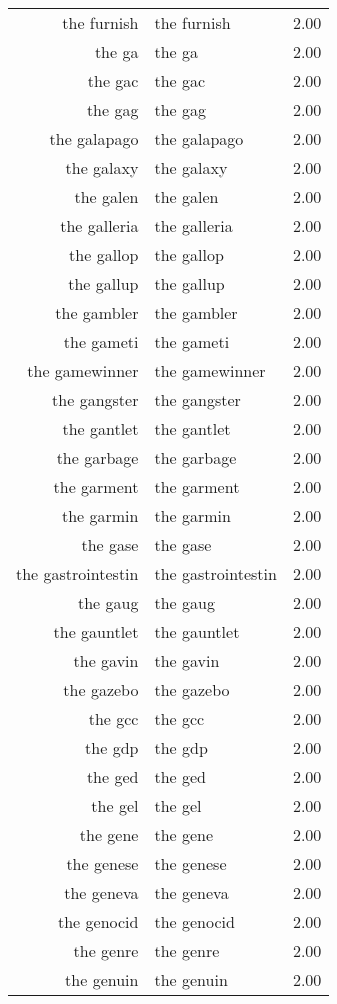 \begin{table}[ht]
\begin{tabular}{rlr}
  the furnish & the furnish & 2.00 \\ 
  the ga & the ga & 2.00 \\ 
  the gac & the gac & 2.00 \\ 
  the gag & the gag & 2.00 \\ 
  the galapago & the galapago & 2.00 \\ 
  the galaxy & the galaxy & 2.00 \\ 
  the galen & the galen & 2.00 \\ 
  the galleria & the galleria & 2.00 \\ 
  the gallop & the gallop & 2.00 \\ 
  the gallup & the gallup & 2.00 \\ 
  the gambler & the gambler & 2.00 \\ 
  the gameti & the gameti & 2.00 \\ 
  the gamewinner & the gamewinner & 2.00 \\ 
  the gangster & the gangster & 2.00 \\ 
  the gantlet & the gantlet & 2.00 \\ 
  the garbage & the garbage & 2.00 \\ 
  the garment & the garment & 2.00 \\ 
  the garmin & the garmin & 2.00 \\ 
  the gase & the gase & 2.00 \\ 
  the gastrointestin & the gastrointestin & 2.00 \\ 
  the gaug & the gaug & 2.00 \\ 
  the gauntlet & the gauntlet & 2.00 \\ 
  the gavin & the gavin & 2.00 \\ 
  the gazebo & the gazebo & 2.00 \\ 
  the gcc & the gcc & 2.00 \\ 
  the gdp & the gdp & 2.00 \\ 
  the ged & the ged & 2.00 \\ 
  the gel & the gel & 2.00 \\ 
  the gene & the gene & 2.00 \\ 
  the genese & the genese & 2.00 \\ 
  the geneva & the geneva & 2.00 \\ 
  the genocid & the genocid & 2.00 \\ 
  the genre & the genre & 2.00 \\ 
  the genuin & the genuin & 2.00 \\ 

\end{tabular}
\end{table}
